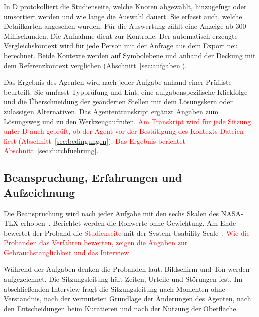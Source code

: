 In D protokolliert die Studienseite, welche Knoten abgewählt, hinzugefügt oder umsortiert werden und wie lange die Auswahl dauert. Sie erfasst auch, welche Detailkarten angesehen wurden. Für die Auswertung zählt eine Anzeige ab 300 Millisekunden. Die Aufnahme dient zur Kontrolle. Der automatisch erzeugte Vergleichskontext wird für jede Person mit der Anfrage aus dem Export neu berechnet. Beide Kontexte werden auf Symbolebene und anhand der Deckung mit dem Referenzkontext verglichen (Abschnitt~\ref{sec:aufgaben}).

Das Ergebnis des Agenten wird nach jeder Aufgabe anhand einer Prüfliste beurteilt. Sie umfasst Typprüfung und Lint, eine aufgabenspezifische Klickfolge und die Überschneidung der geänderten Stellen mit dem Lösungskern oder zulässigen Alternativen. Das Agententranskript ergänzt Angaben zum Lösungsweg und zu den Werkzeugaufrufen. \textcolor{red}{Am Transkript wird für jede Sitzung unter D auch geprüft, ob der Agent vor der Bestätigung des Kontexts Dateien liest (Abschnitt~\ref{sec:bedingungen}). Das Ergebnis berichtet Abschnitt~\ref{sec:durchfuehrung}.}

\subsection{Beanspruchung, Erfahrungen und Aufzeichnung}

Die Beanspruchung wird nach jeder Aufgabe mit den sechs Skalen des NASA-TLX erhoben~\parencite{hart1988tlx}. Berichtet werden die Rohwerte ohne Gewichtung. Am Ende bewertet der Proband die \textcolor{red}{Studienseite} mit der System Usability Scale~\parencite{brooke1996sus}. \textcolor{red}{Wie die Probanden das Verfahren bewerten, zeigen die Angaben zur Gebrauchstauglichkeit und das Interview.}

Während der Aufgaben denken die Probanden laut. Bildschirm und Ton werden aufgezeichnet. Die Sitzungsleitung hält Zeiten, Urteile und Störungen fest. Im abschließenden Interview fragt die Sitzungsleitung nach Momenten ohne Verständnis, nach der vermuteten Grundlage der Änderungen des Agenten, nach den Entscheidungen beim Kuratieren und nach der Nutzung der Oberfläche.


